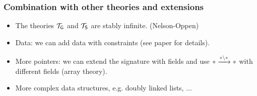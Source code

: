 \documentclass{beamer}
\begin{document}
\begin{frame}
  \frametitle{Combination with other theories and extensions}
  \begin{itemize}
  \item The theories $\mathcal{T}_{\mathsf{G}}$ and $\mathcal{T}_{\mathsf{S}}$ are stably infinite. (Nelson-Oppen)

  \item Data: we can add data with constraints (see paper for details). 


  \item More pointers: we can extend the signature with fields and use $\reachsymf$ with different fields
  (array theory).

  \item More complex data structures, e.g. doubly linked lists, ...


  \end{itemize}
\end{frame}

\section{\Tool}
\end{document}
